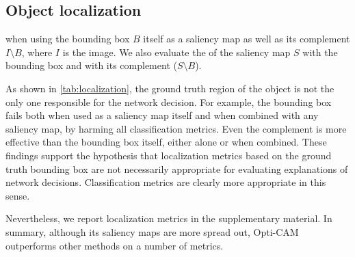 \subsection{Object localization}

 when using the bounding box $B$ itself as a saliency map as well as its complement $I \setminus B$, where $I$ is the image. We also evaluate the  of the saliency map $S$ with the bounding box and with its complement ($S \setminus B$).

As shown in \autoref{tab:localization}, the ground truth region of the object is not the only one responsible for the network decision. For example, the bounding box fails both when used as a saliency map itself and when combined with any saliency map, by harming all classification metrics. Even the complement is more effective than the bounding box itself, either alone or when combined. These findings support the hypothesis that localization metrics based on the ground truth bounding box are not necessarily appropriate for evaluating explanations of network decisions. Classification metrics are clearly more appropriate in this sense.

Nevertheless, we report localization metrics in the supplementary material. In summary, although its saliency maps are more spread out, Opti-CAM outperforms other methods on a number of metrics.

